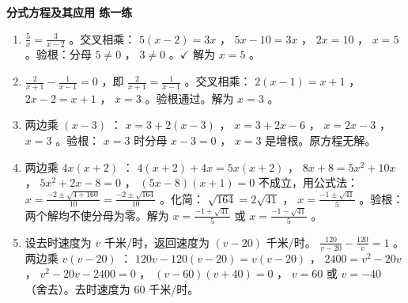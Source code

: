\begin{answer}
\textbf{分式方程及其应用 练一练}

\begin{enumerate}
  \item $\frac{5}{x} = \frac{3}{x-2}$ 。交叉相乘： $5(x-2) = 3x$ ， $5x - 10 = 3x$ ， $2x = 10$ ， $x = 5$ 。验根：分母 $5 \neq 0$ ， $3 \neq 0$ 。$\checkmark$ 解为 $x = 5$ 。
  \item $\frac{2}{x+1} - \frac{1}{x-1} = 0$ ，即 $\frac{2}{x+1} = \frac{1}{x-1}$ 。交叉相乘： $2(x-1) = x+1$ ， $2x - 2 = x + 1$ ， $x = 3$ 。验根通过。解为 $x = 3$ 。
  \item 两边乘 $(x-3)$ ： $x = 3 + 2(x-3)$ ， $x = 3 + 2x - 6$ ， $x = 2x - 3$ ， $x = 3$ 。验根： $x = 3$ 时分母 $x - 3 = 0$ ， $x = 3$ 是增根。原方程无解。
  \item 两边乘 $4x(x+2)$ ： $4(x+2) + 4x = 5x(x+2)$ ， $8x + 8 = 5x^2 + 10x$ ， $5x^2 + 2x - 8 = 0$ ， $(5x - 8)(x + 1) = 0$ 不成立，用公式法： $x = \frac{-2 \pm \sqrt{4 + 160}}{10} = \frac{-2 \pm \sqrt{164}}{10}$ 。化简： $\sqrt{164} = 2\sqrt{41}$ ， $x = \frac{-1 \pm \sqrt{41}}{5}$ 。验根：两个解均不使分母为零。解为 $x = \frac{-1 + \sqrt{41}}{5}$ 或 $x = \frac{-1 - \sqrt{41}}{5}$ 。
  \item 设去时速度为 $v$ 千米/时，返回速度为 $(v - 20)$ 千米/时。 $\frac{120}{v - 20} - \frac{120}{v} = 1$ 。两边乘 $v(v-20)$ ： $120v - 120(v - 20) = v(v - 20)$ ， $2400 = v^2 - 20v$ ， $v^2 - 20v - 2400 = 0$ ， $(v - 60)(v + 40) = 0$ ， $v = 60$ 或 $v = -40$ （舍去）。去时速度为 $60$ 千米/时。
\end{enumerate}


\end{answer}
